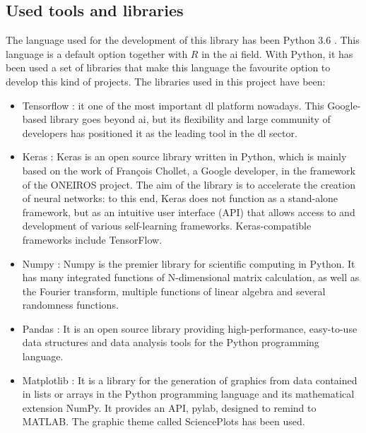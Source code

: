 \subsection{Used tools and libraries} \label{used_libs}

The language used for the development of this library has been Python 3.6 \cite{python}. This language is a default option together with $R$ in the \acrlong{ai} field. With Python, it has been used a set of libraries that make this language the favourite option to develop this kind of projects. The libraries used in this project have been:
 
\begin{itemize}
    \item Tensorflow \cite{tensorflow2015-whitepaper}: it one of the most important \acrlong{dl} platform nowadays. This Google-based library goes beyond \acrlong{ai}, but its flexibility and large community of developers has positioned it as the leading tool in the \acrlong{dl} sector.
    \item Keras \cite{keras}: Keras is an open source library written in Python, which is mainly based on the work of François Chollet, a Google developer, in the framework of the ONEIROS project. The aim of the library is to accelerate the creation of neural networks: to this end, Keras does not function as a stand-alone framework, but as an intuitive user interface (API) that allows access to and development of various self-learning frameworks. Keras-compatible frameworks include TensorFlow.
    \item Numpy \cite{numpy}: Numpy is the premier library for scientific computing in Python. It has many integrated functions of N-dimensional matrix calculation, as well as the Fourier transform, multiple functions of linear algebra and several randomness functions.
    \item Pandas \cite{pandas}: It is an open source library providing high-performance, easy-to-use data structures and data analysis tools for the Python programming language.
    \item Matplotlib \cite{matplotlib}: It is a library for the generation of graphics from data contained in lists or arrays in the Python programming language and its mathematical extension NumPy. It provides an API, pylab, designed to remind to MATLAB. The graphic theme called SciencePlots \cite{SciencePlots} has been used.
\end{itemize}